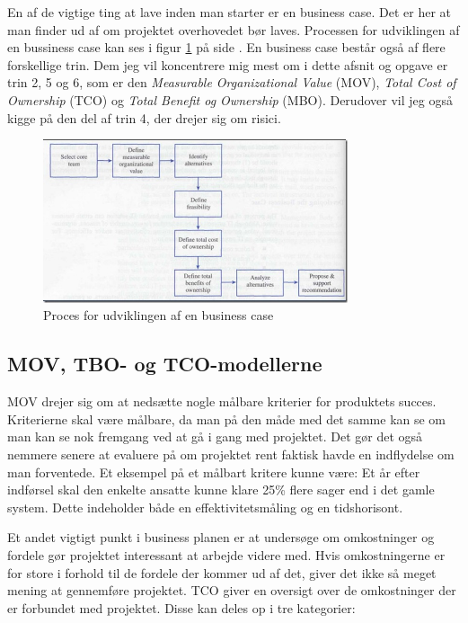 \documentclass[10pt,a4paper,danish]{article}
\begin{document}
En af de vigtige ting at lave inden man starter er en business case. Det er her at man finder ud af om projektet overhovedet bør laves. Processen for udviklingen af en bussiness case kan ses i figur \ref{fig:business} på side \pageref{fig:business}. En business case består også af flere forskellige trin. Dem jeg vil koncentrere mig mest om i dette afsnit og opgave er trin 2, 5 og 6, som er den \textit{Measurable Organizational Value} (MOV), \textit{Total Cost of Ownership} (TCO) og \textit{Total Benefit og Ownership} (MBO). Derudover vil jeg også kigge på den del af trin 4, der drejer sig om risici. 

\begin{figure}[h!]
    \centering
    \includegraphics[width=0.8\textwidth]{business.jpg}
    \caption{Proces for udviklingen af en business case  \cite[~s. 43]{Marchewka}}
    \label{fig:business}
\end{figure}


\subsection{MOV, TBO- og TCO-modellerne}
MOV drejer sig om at nedsætte nogle målbare kriterier for produktets succes. Kriterierne skal være målbare, da man på den måde med det samme kan se om man kan se nok fremgang ved at gå i gang med projektet. Det gør det også nemmere senere at evaluere på om projektet rent faktisk havde en indflydelse om man forventede. Et eksempel på et målbart kritere kunne være: Et år efter indførsel skal den enkelte ansatte kunne klare 25\% flere sager end i det gamle system. Dette indeholder både en effektivitetsmåling og en tidshorisont.

Et andet vigtigt punkt i business planen er at undersøge om omkostninger og fordele gør projektet interessant at arbejde videre med. Hvis omkostningerne er for store i forhold til de fordele der kommer ud af det, giver det ikke så meget mening at gennemføre projektet. TCO giver en oversigt over de omkostninger der er forbundet med projektet. Disse kan deles op i tre kategorier:
\end{document}
